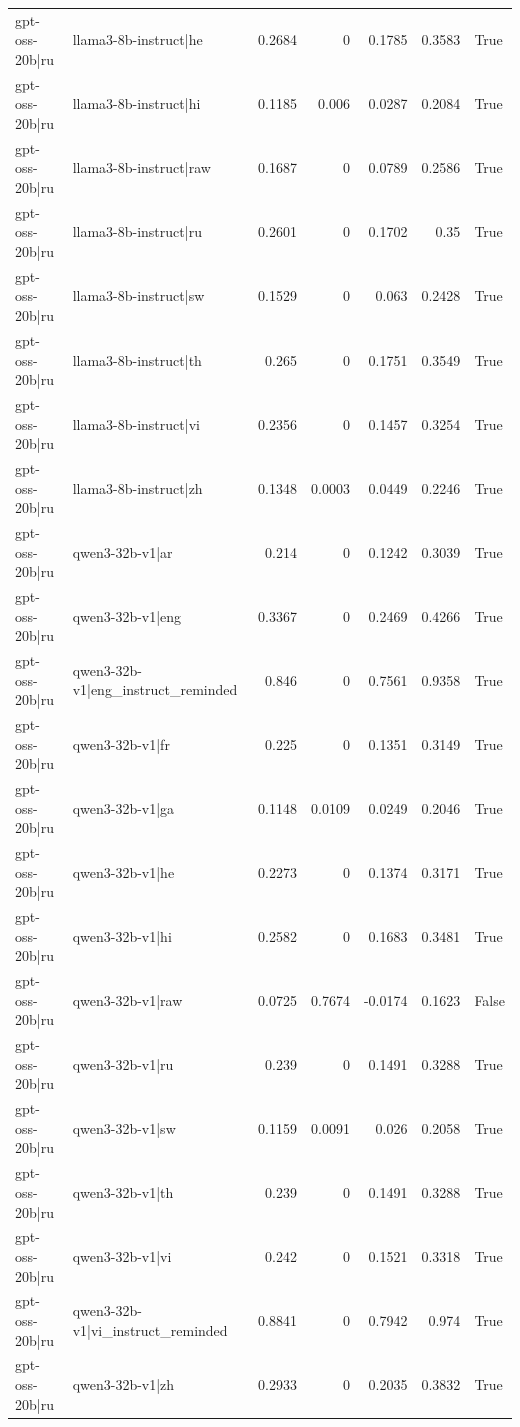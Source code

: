 \begin{table}
\begin{tabular}{l l r r r r l}
gpt-oss-20b|ru & llama3-8b-instruct|he & 0.2684 & 0 & 0.1785 & 0.3583 & True \\
gpt-oss-20b|ru & llama3-8b-instruct|hi & 0.1185 & 0.006 & 0.0287 & 0.2084 & True \\
gpt-oss-20b|ru & llama3-8b-instruct|raw & 0.1687 & 0 & 0.0789 & 0.2586 & True \\
gpt-oss-20b|ru & llama3-8b-instruct|ru & 0.2601 & 0 & 0.1702 & 0.35 & True \\
gpt-oss-20b|ru & llama3-8b-instruct|sw & 0.1529 & 0 & 0.063 & 0.2428 & True \\
gpt-oss-20b|ru & llama3-8b-instruct|th & 0.265 & 0 & 0.1751 & 0.3549 & True \\
gpt-oss-20b|ru & llama3-8b-instruct|vi & 0.2356 & 0 & 0.1457 & 0.3254 & True \\
gpt-oss-20b|ru & llama3-8b-instruct|zh & 0.1348 & 0.0003 & 0.0449 & 0.2246 & True \\
gpt-oss-20b|ru & qwen3-32b-v1|ar & 0.214 & 0 & 0.1242 & 0.3039 & True \\
gpt-oss-20b|ru & qwen3-32b-v1|eng & 0.3367 & 0 & 0.2469 & 0.4266 & True \\
gpt-oss-20b|ru & qwen3-32b-v1|eng_instruct_reminded & 0.846 & 0 & 0.7561 & 0.9358 & True \\
gpt-oss-20b|ru & qwen3-32b-v1|fr & 0.225 & 0 & 0.1351 & 0.3149 & True \\
gpt-oss-20b|ru & qwen3-32b-v1|ga & 0.1148 & 0.0109 & 0.0249 & 0.2046 & True \\
gpt-oss-20b|ru & qwen3-32b-v1|he & 0.2273 & 0 & 0.1374 & 0.3171 & True \\
gpt-oss-20b|ru & qwen3-32b-v1|hi & 0.2582 & 0 & 0.1683 & 0.3481 & True \\
gpt-oss-20b|ru & qwen3-32b-v1|raw & 0.0725 & 0.7674 & -0.0174 & 0.1623 & False \\
gpt-oss-20b|ru & qwen3-32b-v1|ru & 0.239 & 0 & 0.1491 & 0.3288 & True \\
gpt-oss-20b|ru & qwen3-32b-v1|sw & 0.1159 & 0.0091 & 0.026 & 0.2058 & True \\
gpt-oss-20b|ru & qwen3-32b-v1|th & 0.239 & 0 & 0.1491 & 0.3288 & True \\
gpt-oss-20b|ru & qwen3-32b-v1|vi & 0.242 & 0 & 0.1521 & 0.3318 & True \\
gpt-oss-20b|ru & qwen3-32b-v1|vi_instruct_reminded & 0.8841 & 0 & 0.7942 & 0.974 & True \\
gpt-oss-20b|ru & qwen3-32b-v1|zh & 0.2933 & 0 & 0.2035 & 0.3832 & True \\

\end{tabular}
\end{table}
